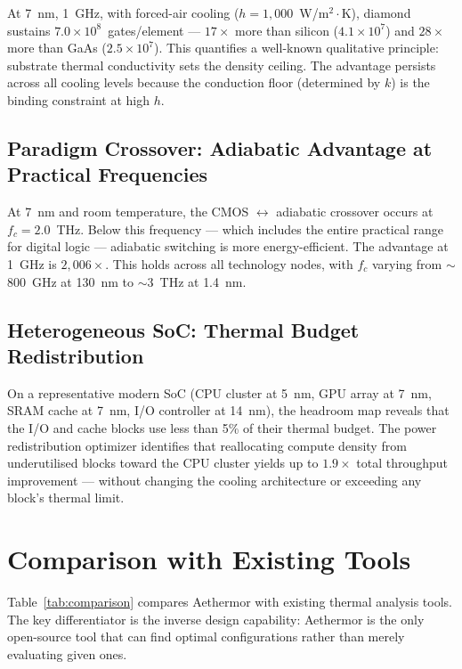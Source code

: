 \documentclass[11pt,twocolumn]{article}
\begin{document}
At 7~nm, 1~GHz, with forced-air cooling ($h = 1{,}000$~W/m$^2\cdot$K),
diamond sustains $7.0 \times 10^8$~gates/element --- $17\times$
more than silicon ($4.1 \times 10^7$) and $28\times$ more than GaAs
($2.5 \times 10^7$). This quantifies a well-known qualitative
principle: substrate thermal conductivity sets the density ceiling. The
advantage persists across all cooling levels because the conduction
floor (determined by $k$) is the binding constraint at high $h$.

\subsection{Paradigm Crossover: Adiabatic Advantage at Practical Frequencies}

At 7~nm and room temperature, the CMOS $\leftrightarrow$ adiabatic
crossover occurs at $f_c = 2.0$~THz. Below this frequency --- which
includes the entire practical range for digital logic --- adiabatic
switching is more energy-efficient. The advantage at 1~GHz is
$2{,}006\times$. This holds across all technology nodes, with $f_c$
varying from $\sim$800~GHz at 130~nm to $\sim$3~THz at 1.4~nm.

\subsection{Heterogeneous SoC: Thermal Budget Redistribution}

On a representative modern SoC (CPU cluster at 5~nm, GPU array at
7~nm, SRAM cache at 7~nm, I/O controller at 14~nm), the headroom map
reveals that the I/O and cache blocks use less than 5\% of their
thermal budget. The power redistribution optimizer identifies that
reallocating compute density from underutilised blocks toward the
CPU cluster yields up to $1.9\times$ total throughput improvement ---
without changing the cooling architecture or exceeding any block's
thermal limit.


\section{Comparison with Existing Tools}
\label{sec:comparison}

Table~\ref{tab:comparison} compares Aethermor with existing thermal
analysis tools. The key differentiator is the inverse design
capability: Aethermor is the only open-source tool that can find
optimal configurations rather than merely evaluating given ones.
\end{document}
